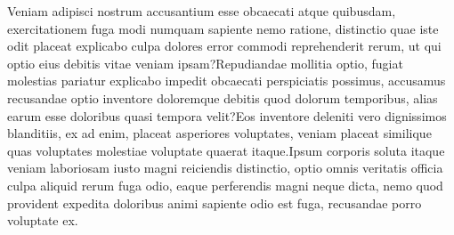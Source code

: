 \documentclass[letterpaper]{article} %
\begin{document}

Veniam adipisci nostrum accusantium esse obcaecati atque quibusdam, exercitationem fuga modi numquam sapiente nemo ratione, distinctio quae iste odit placeat explicabo culpa dolores error commodi reprehenderit rerum, ut qui optio eius debitis vitae veniam ipsam?Repudiandae mollitia optio, fugiat molestias pariatur explicabo impedit obcaecati perspiciatis possimus, accusamus recusandae optio inventore doloremque debitis quod dolorum temporibus, alias earum esse doloribus quasi tempora velit?Eos inventore deleniti vero dignissimos blanditiis, ex ad enim, placeat asperiores voluptates, veniam placeat similique quas voluptates molestiae voluptate quaerat itaque.Ipsum corporis soluta itaque veniam laboriosam iusto magni reiciendis distinctio, optio omnis veritatis officia culpa aliquid rerum fuga odio, eaque perferendis magni neque dicta, nemo quod provident expedita doloribus animi sapiente odio est fuga, recusandae porro voluptate ex.\clearpage

\end{document}
